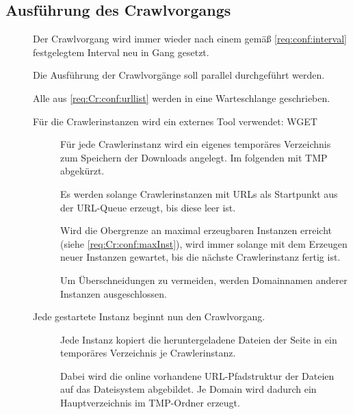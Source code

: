 \subsection{Ausführung des Crawlvorgangs} \label{spec:crawler:exec}
\begin{description}
	\item []
		Der Crawlvorgang wird immer wieder nach einem gemäß \ref{req:conf:interval} festgelegtem
		Interval neu in Gang gesetzt. 
	\item []
		Die Ausführung der Crawlvorgänge soll parallel durchgeführt werden.
	\item []
		Alle aus \ref{req:Cr:conf:urllist} werden in eine Warteschlange geschrieben.
	\item []
				Für die Crawlerinstanzen wird ein externes Tool verwendet: WGET
		\begin{description}
			\item []
				Für jede Crawlerinstanz wird ein eigenes temporäres Verzeichnis zum Speichern
				der Downloads angelegt. Im folgenden mit TMP abgekürzt.
			\item []
				Es werden solange Crawlerinstanzen mit URLs als Startpunkt aus der URL-Queue erzeugt,
				bis diese leer ist. 
			\item []
				Wird die Obergrenze an maximal erzeugbaren Instanzen erreicht 
				(siehe \ref{req:Cr:conf:maxInst}),
				wird immer solange mit dem Erzeugen neuer Instanzen gewartet,
				bis die nächste	Crawlerinstanz fertig ist.
			\item []
				Um Überschneidungen zu vermeiden, werden Domainnamen anderer Instanzen ausgeschlossen.
		\end{description}
	\item []
		Jede gestartete Instanz beginnt nun den Crawlvorgang.
		\begin{description}
			\item []
				Jede Instanz kopiert die heruntergeladene Dateien 
				der Seite in ein temporäres Verzeichnis je Crawlerinstanz.
			\item []
				Dabei wird die online vorhandene URL-Pfadstruktur der Dateien 
				auf das Dateisystem abgebildet.
				Je Domain wird dadurch ein Hauptverzeichnis im TMP-Ordner erzeugt.

\end{description}
\end{description}
